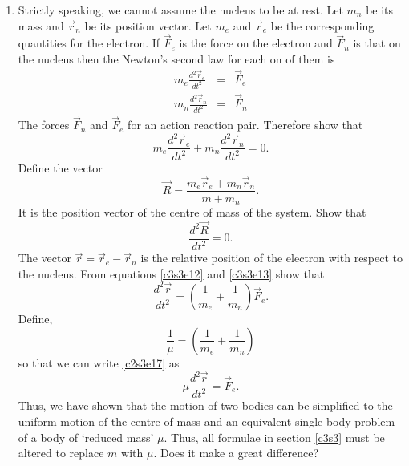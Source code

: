 \begin{enumerate}
\item Strictly speaking, we cannot assume the nucleus to be at rest. Let $m_n$
be its mass and $\vec{r}_n$ be its position vector. Let $m_e$ and $\vec{r}_e$ be 
the corresponding quantities for the electron. If $\vec{F}_e$ is the force on 
the electron and $\vec{F}_n$ is that on the nucleus then the Newton's second 
law for each on of them is
\begin{eqnarray}
m_e\frac{d^2\vec{r}_e}{dt^2} &=& \vec{F}_e \label{c3s3e12} \\
m_n\frac{d^2\vec{r}_n}{dt^2} &=& \vec{F}_n \label{c3s3e13}
\end{eqnarray}
The forces $\vec{F}_n$ and $\vec{F}_e$ for an action reaction pair. Therefore
show that
\begin{equation}\label{c3s3e14}
m_e\frac{d^2\vec{r}_e}{dt^2} + m_n\frac{d^2\vec{r}_n}{dt^2} = 0.
\end{equation}
Define the vector
\begin{equation}\label{c3s3e15}
\vec{R} = \frac{m_e\vec{r}_e + m_n\vec{r}_n}{m + m_n}.
\end{equation}
It is the position vector of the centre of mass of the system. Show that
\begin{equation}\label{c3s3e16}
\frac{d^2\vec{R}}{dt^2} = 0.
\end{equation}
The vector $\vec{r} = \vec{r}_e - \vec{r}_n$ is the relative position of
the electron with respect to the nucleus. From equations \eqref{c3s3e12} 
and \eqref{c3s3e13} show that
\begin{equation}\label{c3s3e17}
\frac{d^2\vec{r}}{dt^2} = \left(\frac{1}{m_e} + \frac{1}{m_n}\right)\vec{F}_e.
\end{equation}
Define,
\begin{equation}\label{c3s3e18}
\frac{1}{\mu} = \left(\frac{1}{m_e} + \frac{1}{m_n}\right)
\end{equation}
so that we can write \eqref{c2s3e17} as
\begin{equation}\label{c3s3e19}
\mu\frac{d^2\vec{r}}{dt^2} = \vec{F}_e.
\end{equation}
Thus, we have shown that the motion of two bodies can be simplified to the
uniform motion of the centre of mass and an equivalent single body problem 
of a body of `reduced mass' $\mu$. Thus, all formulae in section \ref{c3s3}
must be altered to replace $m$ with $\mu$. Does it make a great difference?


\end{enumerate}
